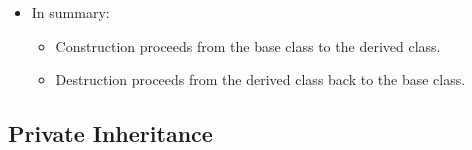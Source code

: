 \documentclass[10pt]{article}
\begin{document}
\begin{itemize}
\begin{verbatim}
Destroy Dog object
        |
        v
Destroy Dog
        |
        v
Destroy Animal
\end{verbatim}

    \item In summary:
    \begin{itemize}
        \item Construction proceeds from the base class to the derived class.
        \item Destruction proceeds from the derived class back to the base class.
    \end{itemize}
\end{itemize}

\newpage

\subsection{Private Inheritance}
\end{document}
